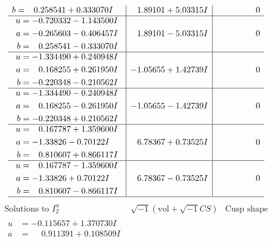 \documentclass[1p]{elsarticle_modified}
\theoremstyle{definition}
\newcommand{\I}{\sqrt{-1}}
\begin{document}
$$\begin{array}{c|c|c}
\begin{aligned}
b &= \phantom{-}0.258541 + 0.333070 I\end{aligned}
 & \phantom{-}1.89101 + 5.03315 I & \phantom{-0.000000 } 0 \\ \hline\begin{aligned}
u &= -0.720332 - 1.143500 I \\
a &= -0.265603 - 0.406457 I \\
b &= \phantom{-}0.258541 - 0.333070 I\end{aligned}
 & \phantom{-}1.89101 - 5.03315 I & \phantom{-0.000000 } 0 \\ \hline\begin{aligned}
u &= -1.334490 + 0.240948 I \\
a &= \phantom{-}0.168255 + 0.261950 I \\
b &= -0.220348 - 0.210562 I\end{aligned}
 & -1.05655 + 1.42739 I & \phantom{-0.000000 } 0 \\ \hline\begin{aligned}
u &= -1.334490 - 0.240948 I \\
a &= \phantom{-}0.168255 - 0.261950 I \\
b &= -0.220348 + 0.210562 I\end{aligned}
 & -1.05655 - 1.42739 I & \phantom{-0.000000 } 0 \\ \hline\begin{aligned}
u &= \phantom{-}0.167787 + 1.359600 I \\
a &= -1.33826 - 0.70122 I \\
b &= \phantom{-}0.810607 + 0.866117 I\end{aligned}
 & \phantom{-}6.78367 + 0.73525 I & \phantom{-0.000000 } 0 \\ \hline\begin{aligned}
u &= \phantom{-}0.167787 - 1.359600 I \\
a &= -1.33826 + 0.70122 I \\
b &= \phantom{-}0.810607 - 0.866117 I\end{aligned}
 & \phantom{-}6.78367 - 0.73525 I & \phantom{-0.000000 } 0\\
 \hline 
 \end{array}$$\newpage$$\begin{array}{c|c|c}  
\text{Solutions to }I^u_{2}& \I (\text{vol} + \sqrt{-1}CS) & \text{Cusp shape}\\
 \hline 
\begin{aligned}
u &= -0.115657 + 1.370730 I \\
a &= \phantom{-}0.911391 + 0.108509 I \\

\end{aligned}
\end{array}$$
\end{document}
